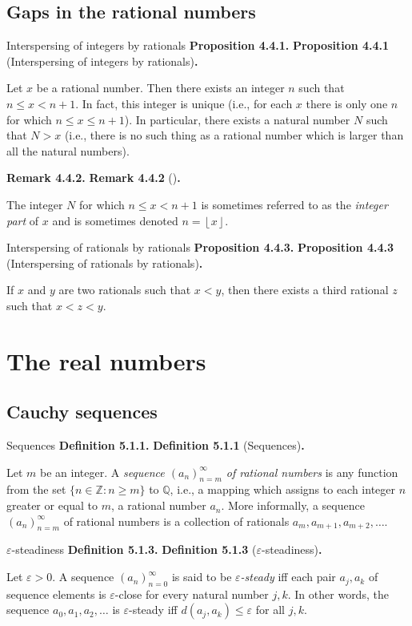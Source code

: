 \documentclass[12pt]{article}
\newcommand{\floor}[1]{\left\lfloor #1 \right\rfloor}
\newenvironment{df}[2][\relax]{
\vspace{4mm}
    \noindent\setlength{\parskip}{1em}%
    \ifx#1\relax%
        \textbf{#2. }%
    \else%
        \textbf{#2} (#1)\textbf{. }%
    \fi%
    \ignorespaces%
}{}
\theoremstyle{remark}
\begin{document}
\subsection{Gaps in the rational numbers}

\begin{df}[Interspersing of integers by rationals]{Proposition 4.4.1}
    Let $x$ be a rational number.
    Then there exists an integer $n$ such that $n \le x < n+1$.
    In fact, this integer is unique (i.e., for each $x$ there is only one $n$ for which $n \le x \le n + 1$).
    In particular, there exists a natural number $N$ such that $N > x$ (i.e., there is no such thing as a rational number which is larger than all the natural numbers).
\end{df}


\begin{df}{Remark 4.4.2}
    The integer $N$ for which $n \le x < n + 1$ is sometimes referred to as the \emph{integer part} of $x$ and is sometimes denoted $n = \floor{x}$.
\end{df}


\begin{df}[Interspersing of rationals by rationals]{Proposition 4.4.3}
    If $x$ and $y$ are two rationals such that $x < y$, then there exists a third rational $z$ such that $x < z < y$.
\end{df}


\pagebreak


\section{The real numbers}
\subsection{Cauchy sequences}

\begin{df}[Sequences]{Definition 5.1.1}
    Let $m$ be an integer.
    A \emph{sequence $(a_n)^\infty_{n=m}$ of rational numbers} is any function from the set $\{ n \in \mathbb{Z} : n \ge m \}$ to $\mathbb{Q}$,
    i.e., a mapping which assigns to each integer $n$ greater or equal to $m$, a rational number $a_n$.
    More informally, a sequence $(a_n)^\infty_{n=m}$ of rational numbers is a collection of rationals $a_m, a_{m+1}, a_{m+2}, \ldots$.
\end{df}


\begin{df}[$\varepsilon$-steadiness]{Definition 5.1.3}
    Let $\varepsilon > 0$. A sequence $(a_n)^\infty_{n=0}$ is said to be \emph{$\varepsilon$-steady} iff each pair $a_j, a_k$ of sequence elements is $\varepsilon$-close for every natural number $j, k$.
    In other words, the sequence $a_0, a_1, a_2, \ldots$ is $\varepsilon$-steady iff $d(a_j, a_k) \le \varepsilon$ for all $j, k$.
\end{df}
\end{document}
